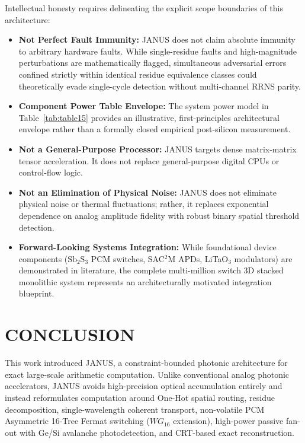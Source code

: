 \documentclass[journal]{IEEEtran}
\begin{document}
Intellectual honesty requires delineating the explicit scope boundaries of this architecture:
\begin{itemize}
\item \textbf{Not Perfect Fault Immunity:} JANUS does not claim absolute immunity to arbitrary hardware faults. While single-residue faults and high-magnitude perturbations are mathematically flagged, simultaneous adversarial errors confined strictly within identical residue equivalence classes could theoretically evade single-cycle detection without multi-channel RRNS parity.
\item \textbf{Component Power Table Envelope:} The system power model in Table~\ref{tab:table15} provides an illustrative, first-principles architectural envelope rather than a formally closed empirical post-silicon measurement.
\item \textbf{Not a General-Purpose Processor:} JANUS targets dense matrix-matrix tensor acceleration. It does not replace general-purpose digital CPUs or control-flow logic.
\item \textbf{Not an Elimination of Physical Noise:} JANUS does not eliminate physical noise or thermal fluctuations; rather, it replaces exponential dependence on analog amplitude fidelity with robust binary spatial threshold detection.
\item \textbf{Forward-Looking Systems Integration:} While foundational device components ($\mathrm{Sb_2S_3}$ PCM switches, SAC$^2$M APDs, LiTaO$_3$ modulators) are demonstrated in literature, the complete multi-million switch 3D stacked monolithic system represents an architecturally motivated integration blueprint.
\end{itemize}

\section{CONCLUSION}

This work introduced JANUS, a constraint-bounded photonic architecture for exact large-scale arithmetic computation. Unlike conventional analog photonic accelerators, JANUS avoids high-precision optical accumulation entirely and instead reformulates computation around One-Hot spatial routing, residue decomposition, single-wavelength coherent transport, non-volatile PCM Asymmetric 16-Tree Fermat switching ($WG_{16}$ extension), high-power passive fan-out with Ge/Si avalanche photodetection, and CRT-based exact reconstruction.
\end{document}
